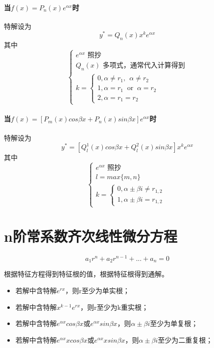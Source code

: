 \paragraph{当\(f(x) = P_n(x)e^{\alpha x}\)时}
特解设为
\[y^* = Q_n(x)x^ke^{\alpha x}\]其中
\[\begin{cases}
    e^{\alpha x}\text{ 照抄} \\
    Q_n(x)\text{ 多项式，通常代入计算得到} \\
    k = \begin{cases}
        0, \alpha \neq r_1,\ \ \alpha \neq r_2 \\ 
        1, \alpha = r_1\ \text{ or }\ \alpha = r_2 \\ 
        2, \alpha = r_1 = r_2
    \end{cases}
\end{cases}\]

\paragraph{当\(f(x) = [P_m(x)cos\beta x + P_n(x)sin\beta x]e^{\alpha x}\)时}
特解设为
\[y^* = [Q_l^1(x)cos\beta x + Q_l^2(x)sin\beta x]x^ke^{\alpha x}\]
其中
\[\begin{cases}
    e^{\alpha x}\text{ 照抄} \\ 
    l = max\{m, n\} \\ 
    k = \begin{cases}
        0, \alpha \pm \beta i \neq r_{1,2} \\ 
        1, \alpha \pm \beta i = r_{1,2}
    \end{cases}
\end{cases}\]


\section{n阶常系数齐次线性微分方程}
\[a_1r^n + a_2r^{n - 1} + ... + a_n = 0\]

根据特征方程得到特征根的值，根据特征根得到通解。
\begin{itemize}
    \item 若解中含特解\(e^{rx}\)，则r至少为单实根；
    \item 若解中含特解\(x^{k - 1}e^{rx}\)，则r至少为k重实根；
    \item 若解中含特解\(e^{\alpha x}cos\beta x\)或\(e^{\alpha x}sin\beta x\)，则\(\alpha \pm \beta i\)至少为单复根；
    \item 若解中含特解\(e^{\alpha x}xcos\beta x\)或\(e^{\alpha x}xsin\beta x\)，则\(\alpha \pm \beta i\)至少为二重复根；
\end{itemize}


